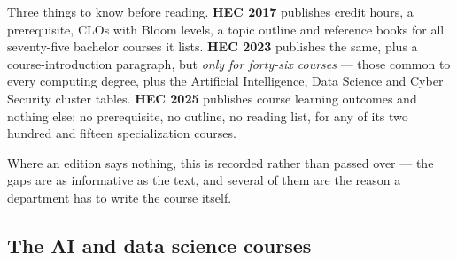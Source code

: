 \documentclass[11pt,a4paper,oneside]{report}
\begin{document}
Three things to know before reading. \textbf{HEC 2017} publishes credit hours, a
prerequisite, CLOs with Bloom levels, a topic outline and reference books for all
seventy-five bachelor courses it lists. \textbf{HEC 2023} publishes the same, plus
a course-introduction paragraph, but \emph{only for forty-six courses} --- those
common to every computing degree, plus the Artificial Intelligence, Data Science
and Cyber Security cluster tables. \textbf{HEC 2025} publishes course learning
outcomes and nothing else: no prerequisite, no outline, no reading list, for any
of its two hundred and fifteen specialization courses.

Where an edition says nothing, this is recorded rather than passed over --- the
gaps are as informative as the text, and several of them are the reason a
department has to write the course itself.

\subsection{The AI and data science courses}
\end{document}
